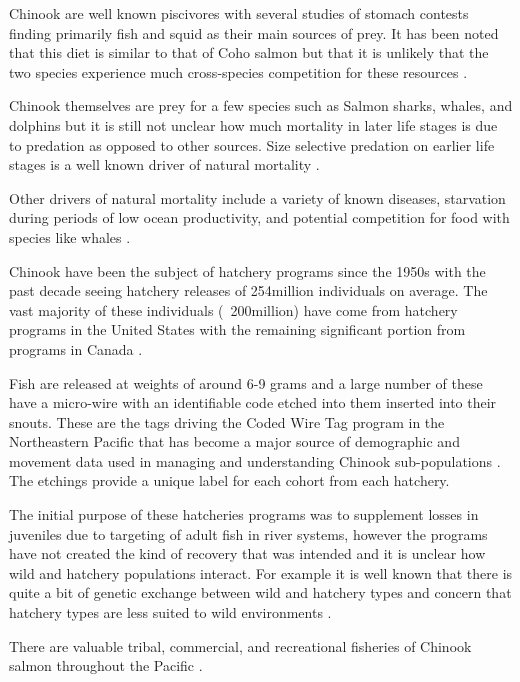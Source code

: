 \documentclass[11pt]{article}
\begin{document}
Chinook are well known piscivores with several studies of stomach contests finding primarily fish and squid as their main sources of prey. It has been noted that this diet is similar to that of Coho salmon but that it is unlikely that the two species experience much cross-species competition for these resources \cite{oceanchinook}. 

Chinook themselves are prey for a few species such as Salmon sharks, whales, and dolphins but it is still not unclear how much mortality in later life stages is due to predation as opposed to other sources. Size selective predation on earlier life stages is a well known driver of natural mortality \cite{oceanchinook}. 

Other drivers of natural mortality include a variety of known diseases, starvation during periods of low ocean productivity, and potential competition for food with species like whales \cite{oceanchinook}.\newline

Chinook have been the subject of hatchery programs since the 1950s with the past decade seeing hatchery releases of 254million individuals on average. The vast majority of these individuals (~200million) have come from hatchery programs in the United States with the remaining significant portion from programs in Canada \cite{oceanchinook}. 

Fish are released at weights of around 6-9 grams and a large number of these have a micro-wire with an identifiable code etched into them inserted into their snouts. These are the tags driving the Coded Wire Tag program in the Northeastern Pacific that has become a major source of demographic and movement data used in managing and understanding Chinook sub-populations \cite{shelton2019}. The etchings provide a unique label for each cohort from each hatchery. 

The initial purpose of these hatcheries programs was to supplement losses in juveniles due to targeting of adult fish in river systems, however the programs have not created the kind of recovery that was intended and it is unclear how wild and hatchery populations interact. For example it is well known that there is quite a bit of genetic exchange between wild and hatchery types and concern that hatchery types are less suited to wild environments \cite{oceanchinook}. \newline

There are valuable tribal, commercial, and recreational fisheries of Chinook salmon throughout the Pacific \cite{salmonplan}.
\end{document}
